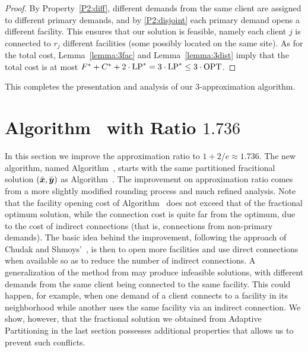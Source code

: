 \documentclass[11pt]{article}
\begin{document}
\begin{proof}
  By Property~\ref{P2:diff}, different demands from the same
  client are assigned to different primary demands, and by
  \ref{P2:disjoint} each primary demand opens a different
  facility. This ensures that our solution is feasible,
  namely each client $j$ is connected to $r_j$ different
  facilities (some possibly located on the same site).  As
  for the total cost, Lemma~\ref{lemma:3fac} and
  Lemma~\ref{lemma:3dist} imply that the total cost is at
  most $F^\ast+C^\ast+2\cdot\mbox{\rm LP}^\ast = 3\cdot\mbox{\rm LP}^\ast \leq
  3\cdot\mbox{\rm OPT}$.
\end{proof}



This completes the presentation and analysis of our $3$-approximation algorithm.


\section{Algorithm~{\ECHU} with Ratio $1.736$}\label{sec: 1.736-approximation}

In this section we improve the approximation ratio to $1+2/e
\approx 1.736$. The new algorithm, named Algorithm~{\ECHU},
starts with the same partitioned fracitional solution
$(\bar{\boldsymbol{x}}, \bar{\boldsymbol{y}})$ as Algorithm~{\EGUP}. The improvement
on approximation ratio comes from a more slightly modified
rounding process and much refined analysis.  Note that the
facility opening cost of Algorithm~{\EGUP} does not exceed
that of the fractional optimum solution, while the
connection cost is quite far from the optimum, due to the
cost of indirect connections (that is, connections from
non-primary demands).  The basic idea behind the
improvement, following the approach of Chudak and
Shmoys'~\cite{ChudakS04}, is then to open more facilities
and use direct connections when available so as to reduce
the number of indirect connections. A {\naive}
generalization of the method from \cite{ChudakS04} may
produce infeasible solutions, with different demands from
the same client being connected to the same facility. This
could happen, for example, when one demand of a client
connects to a facility in its neighborhood while another
uses the same facility via an indirect connection. We show,
however, that the fractional solution we obtained from
Adaptive Partitioning in the last section possesses
additional properties that allows us to prevent such
conflicts.
\end{document}
